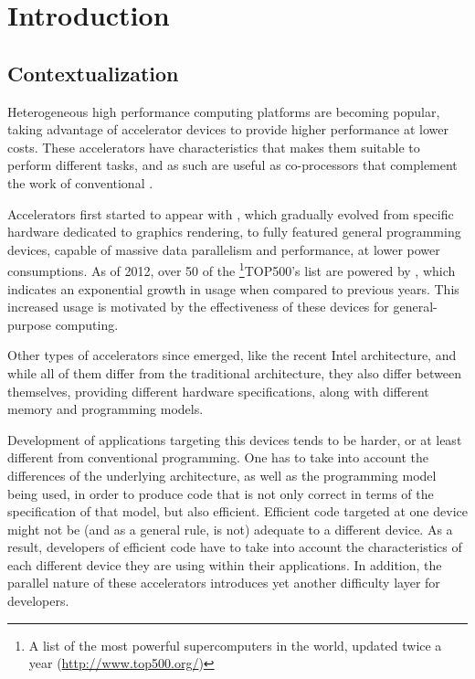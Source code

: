 \documentclass[main.tex]{subfiles}
\begin{document}
\newpage
\section{Introduction}

\subsection{Contextualization}

Heterogeneous high performance computing platforms are becoming popular, taking advantage of accelerator devices to provide higher performance at lower costs. These accelerators have characteristics that makes them suitable to perform different tasks, and as such are useful as co-processors that complement the work of conventional \cpus.

Accelerators first started to appear with \gpus, which gradually evolved from specific hardware dedicated to graphics rendering, to fully featured general programming devices, capable of massive data parallelism and performance, at lower power consumptions. As of 2012, over 50 of the \footnote{A list of the most powerful supercomputers in the world, updated twice a year (\url{http://www.top500.org/})}{TOP500's} list are powered by \gpus, which indicates an exponential growth in usage when compared to previous years. This increased usage is motivated by the effectiveness of these devices for general-purpose computing.

Other types of accelerators since emerged, like the recent Intel \mic architecture, and while all of them differ from the traditional \cpu architecture, they also differ between themselves, providing different hardware specifications, along with different memory and programming models.

Development of applications targeting this devices tends to be harder, or at least different from conventional programming. One has to take into account the differences of the underlying architecture, as well as the programming model being used, in order to produce code that is not only correct in terms of the specification of that model, but also efficient. Efficient code targeted at one device might not be (and as a general rule, is not) adequate to a different device. As a result, developers of efficient code have to take into account the characteristics of each different device they are using within their applications. In addition, the parallel nature of these accelerators introduces yet another difficulty layer for developers.
\end{document}
